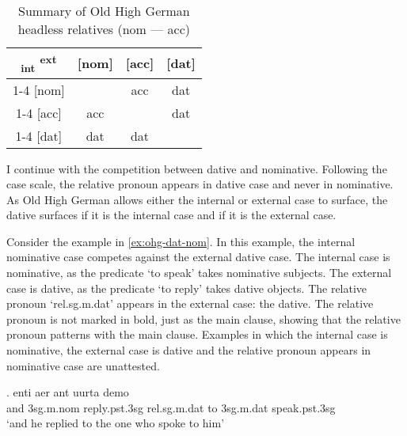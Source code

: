 \begin{table}[H]
  \center
  \caption{Summary of Old High German headless relatives (\ac{nom} --- \ac{acc})}
  \begin{tabular}{c|c|c|c}
    \toprule
        \textsubscript{\ac{int}} \textsuperscript{\ac{ext}}
          & [\ac{nom}]
          & [\ac{acc}]
          & [\ac{dat}]
          \\ \cmidrule{1-4}
      [\ac{nom}]
          & \xcancel{\phantom{xx}}
          & \cellcolor{LG}\ac{acc}
          & \ac{dat}
          \\ \cmidrule{1-4}
      [\ac{acc}]
          & \cellcolor{DG}\ac{acc}
          & \xcancel{\phantom{xx}}
          & \ac{dat}
          \\ \cmidrule{1-4}
      [\ac{dat}]
          & \ac{dat}
          & \ac{dat}
          & \xcancel{\phantom{xx}}
          \\
    \bottomrule
  \end{tabular}
    \label{tbl:summary-old-high-german-nom-acc}
\end{table}

I continue with the competition between dative and nominative. Following the case scale, the relative pronoun appears in dative case and never in nominative. As Old High German allows either the internal or external case to surface, the dative surfaces if it is the internal case and if it is the external case.

Consider the example in \ref{ex:ohg-dat-nom}. In this example, the internal nominative case competes against the external dative case.
The internal case is nominative, as the predicate  `to speak' takes nominative subjects.
The external case is dative, as the predicate  `to reply' takes dative objects.
The relative pronoun  `\ac{rel}.\ac{sg}.\ac{m}.\ac{dat}' appears in the external case: the dative. The relative pronoun is not marked in bold, just as the main clause, showing that the relative pronoun patterns with the main clause.
Examples in which the internal case is nominative, the external case is dative and the relative pronoun appears in nominative case are unattested.

\exg. enti aer {ant uurta} demo  \\
and 3\ac{sg}.\ac{m}.\ac{nom} reply.\ac{pst}.3\ac{sg}\scsub{[dat]} \ac{rel}.\ac{sg}.\ac{m}.\ac{dat} {to 3\ac{sg}.\ac{m}.\ac{dat}} speak.\ac{pst}.3\ac{sg}\scsub{[nom]}\\
`and he replied to the one who spoke to him' \label{ex:ohg-dat-nom}

